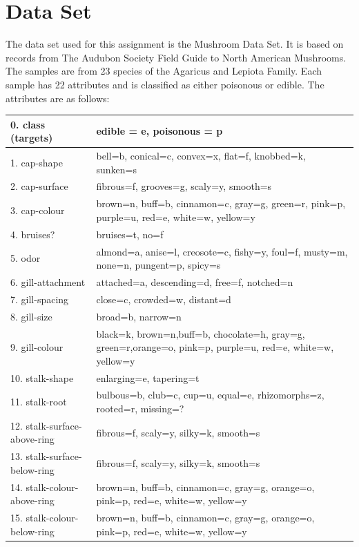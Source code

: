 \documentclass[12pt]{book}
\begin{document}
\section{Data Set}
The data set used for this assignment is the Mushroom Data Set.\cite{dataset}
It is based on records from The Audubon Society Field Guide to North American Mushrooms.
The samples are from 23 species of the Agaricus and Lepiota Family.
Each sample has 22 attributes and is classified as either poisonous or edible.
The attributes are as follows:
\begin{center}
\begin{tabularx}{\linewidth}{ |l|X| }
\hline
 0. class (targets) & edible = e, poisonous = p \\
 \hline
 1. cap-shape & bell=b, conical=c, convex=x, flat=f, knobbed=k, sunken=s \\
 \hline
 2. cap-surface & fibrous=f, grooves=g, scaly=y, smooth=s \\
 \hline
 3. cap-colour & brown=n, buff=b, cinnamon=c, gray=g, green=r, pink=p, purple=u, red=e, white=w, yellow=y \\ \hline 4. bruises? & bruises=t, no=f \\
 \hline
 5. odor & almond=a, anise=l, creosote=c, fishy=y, foul=f, musty=m, none=n, pungent=p, spicy=s \\ \hline 6. gill-attachment & attached=a, descending=d, free=f, notched=n \\
 \hline
 7. gill-spacing & close=c, crowded=w, distant=d \\ \hline 8. gill-size & broad=b, narrow=n \\
 \hline
 9. gill-colour & black=k, brown=n,buff=b, chocolate=h, gray=g, green=r,orange=o, pink=p, purple=u, red=e, white=w, yellow=y \\
 \hline
 10. stalk-shape & enlarging=e, tapering=t \\ \hline 11. stalk-root & bulbous=b, club=c, cup=u, equal=e, rhizomorphs=z, rooted=r, missing=? \\
\hline
 12. stalk-surface-above-ring & fibrous=f, scaly=y, silky=k, smooth=s \\ \hline 13. stalk-surface-below-ring & fibrous=f, scaly=y, silky=k, smooth=s \\
\hline
 14. stalk-colour-above-ring & brown=n, buff=b, cinnamon=c, gray=g, orange=o, pink=p, red=e, white=w, yellow=y \\
\hline
 15. stalk-colour-below-ring & brown=n, buff=b, cinnamon=c, gray=g, orange=o, pink=p, red=e, white=w, yellow=y \\

\end{tabularx}
\end{center}
\end{document}
